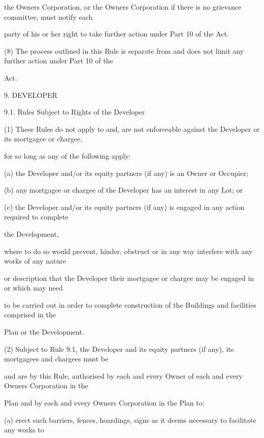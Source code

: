 \documentclass{article}
\begin{document}
{\fontsize{10.02}{1}the Owners Corporation, or the Owners Corporation if there is no grievance committee, must notify each }

{\fontsize{10.02}{1}party of his or her right to take further action under Part 10 of the Act. }

{\fontsize{9.962}{1}(8) The process outlined in this Rule is separate from and does not limit any further action under Part 10 of the }

{\fontsize{10.02}{1}Act. }

{\fontsize{9.99}{1}9. DEVELOPER }

{\fontsize{9.99}{1}9.1. Rules Subject to Rights of the Developer }

{\fontsize{9.962}{1}(1) These Rules do not apply to and, are not enforceable against the Developer or its mortgagee or chargee, }

{\fontsize{10.02}{1}for so long as any of the following apply: }

{\fontsize{9.962}{1}(a) the Developer and/or its equity partners (if any) is an Owner or Occupier; }

{\fontsize{9.962}{1}(b) any mortgagee or chargee of the Developer has an interest in any Lot; or }

{\fontsize{9.962}{1}(c) the Developer and/or its equity partners (if any) is engaged in any action required to complete }

{\fontsize{10.02}{1}the Development, }

{\fontsize{10.02}{1}where to do so would prevent, hinder, obstruct or in any way interfere with any works of any nature }

{\fontsize{10.02}{1}or description that the Developer their mortgagee or chargee may be engaged in or which may need }

{\fontsize{10.02}{1}to be carried out in order to complete construction of the Buildings and facilities comprised in the }

{\fontsize{10.02}{1}Plan or the Development. }

{\fontsize{9.962}{1}(2) Subject to Rule 9.1, the Developer and its equity partners (if any), its mortgagees and chargees must be }

{\fontsize{10.02}{1}and are by this Rule, authorised by each and every Owner of each and every Owners Corporation in the }

{\fontsize{10.02}{1}Plan and by each and every Owners Corporation in the Plan to: }

{\fontsize{9.962}{1}(a) erect such barriers, fences, hoardings, signs as it deems necessary to facilitate any works to }
\end{document}
